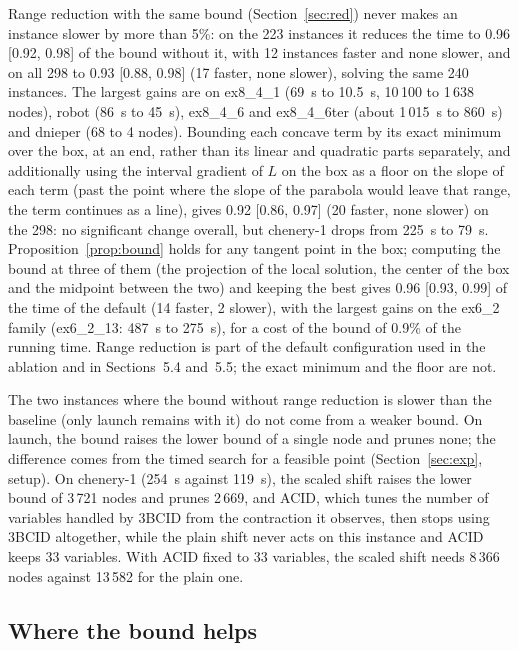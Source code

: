 \documentclass[11pt]{article}
\begin{document}
Range reduction with the same bound (Section~\ref{sec:red}) never makes an instance
slower by more than 5\%: on the 223 instances it reduces the time to 0.96 [0.92, 0.98]
of the bound without it, with 12 instances faster and none slower, and on all 298 to
0.93 [0.88, 0.98] (17 faster, none slower), solving the same 240 instances. The largest
gains are on ex8\_4\_1 (69~s to 10.5~s, 10\,100 to 1\,638 nodes), robot (86~s to 45~s),
ex8\_4\_6 and ex8\_4\_6ter (about 1\,015~s to 860~s) and dnieper (68 to 4 nodes).
Bounding each concave term by its exact minimum over the box, at an end, rather than
its linear and quadratic parts separately, and additionally using the interval
gradient of $L$ on the box as a floor on the slope of each term (past the point where
the slope of the parabola would leave that range, the term continues as a line), gives
0.92 [0.86, 0.97] (20 faster, none slower) on the 298: no significant change overall,
but chenery-1 drops from 225~s to 79~s. Proposition~\ref{prop:bound} holds for any
tangent point in the box; computing the bound at three of them (the projection of the
local solution, the center of the box and the midpoint between the two) and keeping the
best gives 0.96 [0.93, 0.99] of the time of the default (14 faster, 2 slower), with the
largest gains on the ex6\_2 family (ex6\_2\_13: 487~s to 275~s), for a cost of the bound
of 0.9\% of the running time. Range reduction is part of the default
configuration used in the ablation and in Sections~5.4 and~5.5; the exact minimum and
the floor are not.

The two instances where the bound without range reduction is slower than the baseline
(only launch remains with it) do not come from a weaker bound. On launch, the bound raises the lower bound of a single node and prunes none; the difference
comes from the timed search for a feasible point (Section~\ref{sec:exp}, setup). On
chenery-1 (254~s against 119~s), the scaled shift raises the lower bound of 3\,721 nodes
and prunes 2\,669, and ACID, which tunes the number of variables handled by 3BCID from
the contraction it observes, then stops using 3BCID altogether, while the plain shift
never acts on this instance and ACID keeps 33 variables. With ACID fixed to 33
variables, the scaled shift needs 8\,366 nodes against 13\,582 for the plain one.

\subsection{Where the bound helps}
\end{document}
